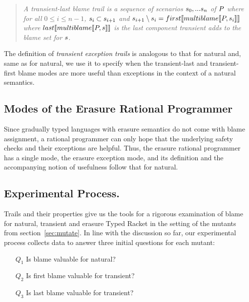 \begin{quote}
\it A \emph{transient-last blame trail} is a sequence of scenarios
$s_0,...s_n$ of $P$ where for all $0 \leq i \leq n - 1$,
$s_i \subset s_{i+1}$ and $s_{i+1} \setminus s_i =
  first\llbracket multiblame\llbracket P, s_i\rrbracket\rrbracket$ where $last\llbracket multiblame\llbracket P, s\rrbracket\rrbracket$ is the
last component transient adds to the blame set for $s$.
\end{quote}

The definition of \emph{transient exception trails} 
is analogous to that for natural and, same as for natural, we use it to  
specify when the transient-last and transient-first blame modes are more
useful than exceptions in the context of a natural semantics.  


\subsection{Modes of the Erasure Rational Programmer} \label{sub:erasure}

 Since gradually typed languages with erasure semantics do not come with
 blame assignment, a rational programmer can only hope that the underlying
 safety checks and their exceptions are helpful.  Thus, the erasure 
 rational programmer has a single mode, the erasure exception mode, and
 its definition and the accompanying notion of usefulness follow that for
 natural.

\subsection{Experimental Process.}

Trails and their properties give us the tools for a rigorous examination
of blame for natural, transient and erasure Typed Racket in the setting of the 
mutants from section~\ref{sec:mutate}. In line with the discussion so far, 
our experimental process collects data to answer three initial questions for each mutant:
\begin{itemize}
\item[$Q_1$] Is blame valuable for natural?

\item[$Q_2$] Is first blame valuable for transient?

\item[$Q_3$] Is last blame valuable for transient?

\end{itemize}

